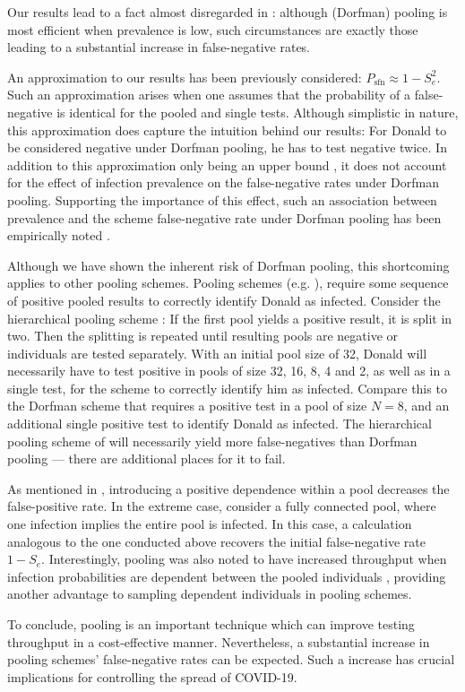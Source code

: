 \documentclass{article}
\newcommand{\Se}{S_e}
\newcommand{\mi}{P_{\text{sfn}}}
\begin{document}
Our results lead to a fact almost disregarded in \cite{DorfmanYuvalDor}: although (Dorfman) pooling is most efficient when prevalence is low, such circumstances are exactly those leading to a substantial increase in false-negative rates. 

An approximation to our results has been previously considered: $\mi \approx 1-\Se^2 $\cite{Simplistic1, Simplistic2, Kim, OptimalDorfmanPool}. Such an approximation arises when one assumes that the probability of a false-negative is identical for the pooled and single tests. Although simplistic in nature, this approximation does capture the intuition behind our results: For Donald to be considered negative under Dorfman pooling, he has to test negative twice. In addition to this approximation only being an upper bound \cite{Simplistic2}, it does not account for the effect of infection prevalence on the false-negative rates under Dorfman pooling. Supporting the importance of this effect, such an association between prevalence and the scheme false-negative rate under Dorfman pooling has been empirically noted  \cite{DorfmanYuvalDor}.

Although we have shown the inherent risk of Dorfman pooling, this shortcoming applies to other pooling schemes. Pooling schemes (e.g. \cite{MatrixPooling,Lion, Kim}), require some sequence of positive pooled results to correctly identify Donald as infected. Consider the hierarchical pooling scheme \cite{Lion, Kim}: If the first pool yields a positive result, it is split in two. Then the splitting is repeated until resulting pools are negative or individuals are tested separately. With an initial pool size of 32, Donald will necessarily have to test positive in pools of size 32, 16, 8, 4 and 2, as well as in a single test, for the scheme to correctly identify him as infected. Compare this to the Dorfman scheme that requires a positive test in a pool of size $N=8$, and an additional single positive test to identify Donald as infected. The hierarchical pooling scheme of \cite{Lion, Kim} will necessarily yield  more false-negatives than Dorfman pooling --- there are additional places for it to fail.

As mentioned in \cite{DorfmanYuvalDor}, introducing a positive dependence within a pool decreases the false-positive rate. In the extreme case, consider a fully connected pool, where one infection implies the entire pool is infected. In this case, a calculation analogous to the one conducted above recovers the initial false-negative rate $1-\Se$. Interestingly, pooling was also noted to have increased throughput when infection probabilities are dependent between the pooled individuals \cite{DorfmanYuvalDor}, providing  another advantage to sampling dependent individuals in pooling schemes.  

To conclude, pooling is an important technique which can improve testing throughput in a cost-effective manner. Nevertheless, a substantial increase in pooling schemes' false-negative rates can be expected. Such a increase has crucial implications for controlling the spread of COVID-19.






\end{document}
